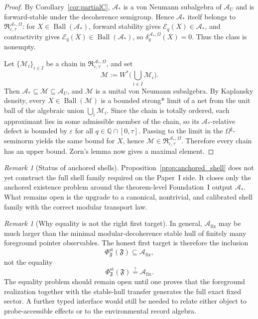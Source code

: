 \documentclass[12pt]{article}
\theoremstyle{definition}
\theoremstyle{remark}
\newtheorem{remark}[theorem]{Remark}
\begin{document}
\begin{proof}
By Corollary~\ref{cor:partialC}, \(\mathcal A_*\) is a von Neumann
subalgebra of \(\mathcal A_U\) and is forward-stable under the
decoherence semigroup. Hence \(\mathcal A_*\) itself belongs to
\(\mathfrak R_{\varepsilon,\tau}^{\mathcal A_*,\Omega}\): for
\(X\in\operatorname{Ball}(\mathcal A_*)\), forward stability gives
\(\mathcal E_q(X)\in\mathcal A_*\), and contractivity gives
\(\mathcal E_q(X)\in\operatorname{Ball}(\mathcal A_*)\), so
\(\delta_q^{\mathcal A_*,\Omega}(X)=0\). Thus the class is nonempty.

Let \(\{\mathcal M_i\}_{i\in I}\) be a chain in
\(\mathfrak R_{\varepsilon,\tau}^{\mathcal A_*,\Omega}\), and set
\[
\mathcal M:=W^*\!\Big(\bigcup_{i\in I}\mathcal M_i\Big).
\]
Then \(\mathcal A_*\subseteq \mathcal M\subseteq \mathcal A_U\), and
\(\mathcal M\) is a unital von Neumann subalgebra. By Kaplansky
density, every \(X\in\operatorname{Ball}(\mathcal M)\) is a bounded
strong* limit of a net from the unit ball of the algebraic union
\(\bigcup_i\mathcal M_i\). Since the chain is totally ordered, each
approximant lies in some admissible member of the chain, so its
\(\mathcal A_*\)-relative defect is bounded by \(\varepsilon\) for all
\(q\in\mathbb Q\cap[0,\tau]\). Passing to the limit in the
\(\Omega^\sharp\)-seminorm yields the same bound for \(X\), hence
\(\mathcal M\in\mathfrak R_{\varepsilon,\tau}^{\mathcal A_*,\Omega}\).
Therefore every chain has an upper bound. Zorn's lemma now gives a
maximal element.
\end{proof}

\begin{remark}[Status of anchored shells]\label{rem:anchored_shell_status}
Proposition~\ref{prop:anchored_shell} does not yet construct the full
shell family required on the Paper~I side. It closes only the anchored
existence problem around the theorem-level Foundation~I output
\(\mathcal A_*\). What remains open is the upgrade to a canonical,
nontrivial, and calibrated shell family with the correct modular
transport law.
\end{remark}

\begin{remark}[Why equality is not the right first target]
In general, \(\mathcal A_{\mathrm{fix}}\) may be much larger than the
minimal modular-decoherence stable hull of finitely many foreground
pointer observables. The honest first target is therefore the inclusion
\[
\Phi_{\mathfrak F}^{\mathrm{st}}(\mathfrak F)\subseteq
\mathcal A_{\mathrm{fix}},
\]
not the equality
\[
\Phi_{\mathfrak F}^{\mathrm{st}}(\mathfrak F)\stackrel{?}{=}
\mathcal A_{\mathrm{fix}}.
\]
The equality problem should remain open until one proves that the
foreground realization together with the stable-hull transfer generates
the full exact fixed sector. A further typed interface would still be
needed to relate either object to probe-accessible effects or to the
environmental record algebra.
\end{remark}
\end{document}
